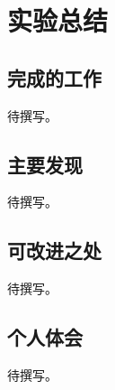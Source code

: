 \section{实验总结}

\subsection{完成的工作}

待撰写。

\subsection{主要发现}

待撰写。

\subsection{可改进之处}

待撰写。

\subsection{个人体会}

待撰写。
